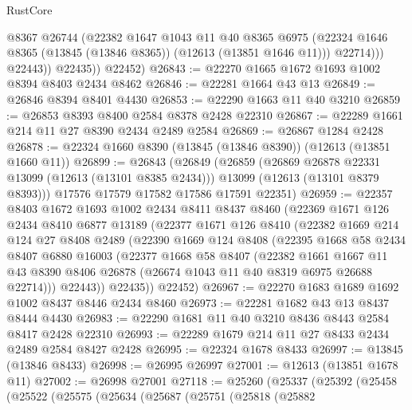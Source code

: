\begin{lexlean}{RustCore}
\begin{coremodule}
                  @8367
                  @26744
                  (@22382
                    @1647
                    @1043
                    @11
                    @40
                    @8365
                    @6975
                    (@22324 @1646 @8365 (@13845 (@13846 @8365)) (@12613 (@13851 @1646 @11)))
                    @22714)))
              @22443))
          @22435))
      @22452)
@26843 := @22270 @1665 @1672 @1693 @1002 @8394 @8403 @2434 @8462
@26846 := @22281 @1664 @43 @13
@26849 := @26846 @8394 @8401 @4430
@26853 := @22290 @1663 @11 @40 @3210
@26859 := @26853 @8393 @8400 @2584 @8378 @2428 @22310
@26867 := @22289 @1661 @214 @11 @27 @8390 @2434 @2489 @2584
@26869 := @26867 @1284 @2428
@26878 := @22324 @1660 @8390 (@13845 (@13846 @8390)) (@12613 (@13851 @1660 @11))
@26899 := @26843
    (@26849
      (@26859
        (@26869 @26878 @22331 @13099 (@12613 (@13101 @8385 @2434)))
        @13099
        (@12613 (@13101 @8379 @8393)))
      @17576
      @17579
      @17582
      @17586
      @17591
      @22351)
@26959 := @22357
    @8403
    @1672
    @1693
    @1002
    @2434
    @8411
    @8437
    @8460
    (@22369
      @1671
      @126
      @2434
      @8410
      @6877
      @13189
      (@22377
        @1671
        @126
        @8410
        (@22382
          @1669
          @214
          @124
          @27
          @8408
          @2489
          (@22390
            @1669
            @124
            @8408
            (@22395
              @1668
              @58
              @2434
              @8407
              @6880
              @16003
              (@22377
                @1668
                @58
                @8407
                (@22382
                  @1661
                  @1667
                  @11
                  @43
                  @8390
                  @8406
                  @26878
                  (@26674 @1043 @11 @40 @8319 @6975 @26688 @22714)))
              @22443))
          @22435))
      @22452)
@26967 := @22270 @1683 @1689 @1692 @1002 @8437 @8446 @2434 @8460
@26973 := @22281 @1682 @43 @13 @8437 @8444 @4430
@26983 := @22290 @1681 @11 @40 @3210 @8436 @8443 @2584 @8417 @2428 @22310
@26993 := @22289 @1679 @214 @11 @27 @8433 @2434 @2489 @2584 @8427 @2428
@26995 := @22324 @1678 @8433
@26997 := @13845 (@13846 @8433)
@26998 := @26995 @26997
@27001 := @12613 (@13851 @1678 @11)
@27002 := @26998 @27001
@27118 := @25260
    (@25337
      (@25392
        (@25458
          (@25522
            (@25575
              (@25634
                (@25687
                  (@25751
                    (@25818
                      (@25882

\end{coremodule}
\end{lexlean}

